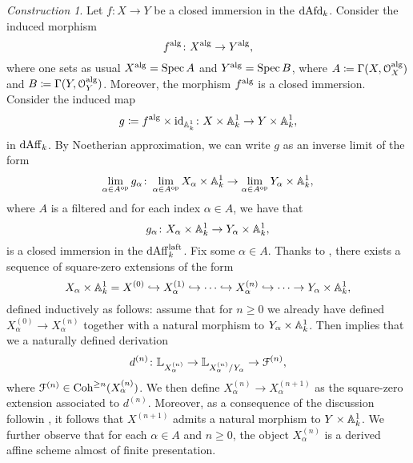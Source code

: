 \documentclass[10pt,a4paper,reqno]{amsart} %
\theoremstyle{plain}
\theoremstyle{definition}
\theoremstyle{remark}
\numberwithin{equation}{section}
\newtheorem{construction}[thm]{Construction}
\begin{document}
\begin{construction} \label{const:construction_of_Hodge_filtration_in_the_lafp_case}
    Let $f \colon X \to Y$ be a closed immersion in the \infcat $\mathrm{dAfd}_k$. Consider the induced morphism
        \[
            f ^\mathrm{alg} \colon X^\mathrm{alg} \to Y^\mathrm{alg},   
        \]
    where one sets as usual $X ^\mathrm{alg} = \operatorname{Spec} A$ and $Y^\mathrm{alg} = \operatorname{Spec} B$, where $A \coloneqq \Gamma(X, \mathcal O_X^\mathrm{alg})$ and $B \coloneqq \Gamma(Y, \mathcal O_Y ^\mathrm{alg})$.
    Moreover, the morphism $f^\mathrm{alg}$ is a closed immersion. Consider the induced map
        \[
            g \coloneqq f ^\mathrm{alg} \times \mathrm{id}_{\mathbb A^1_k} \colon X \times \mathbb A^1_k \to Y \times \mathbb A^1_k,  
        \]
    in $\mathrm{dAff}_k$. By Noetherian approximation, we can write $g$ as an inverse limit of the form
        \[
            \lim_{\alpha \in A ^\mathrm{op}}  g_\alpha \colon \lim_{\alpha \in A ^\mathrm{op}} X_\alpha \times \mathbb A^1_k \to \lim_{\alpha \in A ^\mathrm{op}} Y_\alpha \times \mathbb A^1_k,  
        \]
    where $A$ is a filtered \infcat and for each index $\alpha \in A$, we have that
        \[
            g_\alpha \colon X_\alpha \times \mathbb A^1_k \to Y_\alpha \times \mathbb A^1_k,  
        \]
    is a closed immersion in the \infcat $\mathrm{dAff}_k^{\mathrm{laft}}$. Fix some $\alpha \in A$. Thanks to \cite[Theorem 9.5.1.3]{Gaitsgory_Study_II},
    there exists a sequence of square-zero extensions of the form
        \[
            X_\alpha \times \mathbb A^1_k = X^{(0)} \hookrightarrow X_\alpha^{(1)} \hookrightarrow \dots \hookrightarrow X_\alpha^{(n)} \hookrightarrow \dots \to Y_\alpha \times \mathbb A^1_k,  
        \]
    defined inductively as follows: assume that for $n \ge 0$ we already have defined $X^{(0)}_\alpha \to X^{(n)}_\alpha$ together with a natural morphism
    to $Y_\alpha \times \mathbb A^1_k$. Then \cite[Theorem 9.5.1.3]{Gaitsgory_Study_II} implies that we a naturally defined derivation
        \[
            d^{(n)} \colon \mathbb L_{X_\alpha^{(n)}} \to \mathbb L_{X_\alpha^{(n)}/ Y_\alpha} \to \mathcal F^{(n)},
        \]
    where $\mathcal F^{(n)} \in \mathrm{Coh}^{\ge n}(X_\alpha^{(n)})$. We then define $X^{(n)}_\alpha \to X_\alpha^{(n+1)}$ as the square-zero extension associated to $d^{(n)}$.
    Moreover, as a consequence of the discussion followin \cite[\S 9.5.1]{Gaitsgory_Study_II}, it follows that
    $X^{(n+1)}$ admits a natural morphism to $Y \times \mathbb A^1_k$. We further observe that for each $\alpha \in A$ and $n \ge 0$, the object
    $X^{(n)}_\alpha$ is a derived affine scheme almost of finite presentation.
\end{construction}
\end{document}
